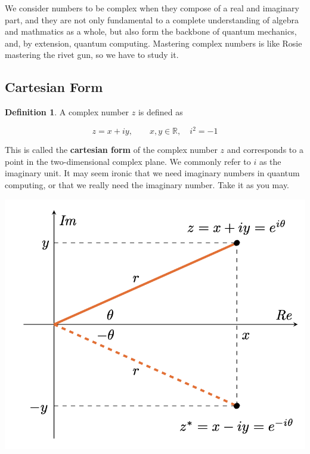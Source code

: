 \documentclass[12pt]{article}
\theoremstyle{definition}
\newtheorem{definition}[theorem]{Definition}
\begin{document}
We consider numbers to be complex when they compose of a real and imaginary part, and they are not only fundamental to a complete understanding of algebra and mathmatics as a whole, but also form the backbone of quantum mechanics, and, by extension, quantum computing. Mastering complex numbers is like Rosie mastering the rivet gun, so we have to study it. 

\subsection{Cartesian Form}


\begin{definition}
    A complex number $z$ is defined as 

    $$
        z = x + iy, \qquad x, y \in \mathbb{R}, \quad i^2 = -1
    $$
\end{definition}

This is called the \textbf{cartesian form} of the complex number $z$ and corresponds to a point in the two-dimensional complex plane. We commonly refer to $i$ as the imaginary unit. It may seem ironic that we need imaginary numbers in quantum computing, or that we really need the imaginary number. Take it as you may. 

\includegraphics[width=\textwidth]{3_cn0.png}

\end{document}
